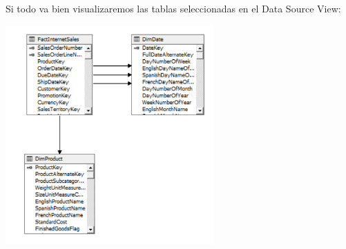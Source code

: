 Si todo va bien visualizaremos las tablas seleccionadas en el Data Source View:
\begin{center}
	\includegraphics[width=8cm]{images/task2/img14}
\end{center}